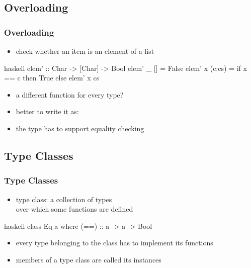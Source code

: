\documentclass[dvipsnames]{beamer}
\theoremstyle{plain}
\begin{document}
\subsection{Overloading}

\begin{frame}[fragile]
  \frametitle{Overloading}

  \begin{itemize}
    \item check whether an item is an element of a list
  \end{itemize}

  \begin{exampleblock}{}
    \begin{pygments}{haskell}
elem' :: Char -> [Char] -> Bool
elem' _ []     = False
elem' x (c:cs) = if x == c then True else elem' x cs
    \end{pygments}
  \end{exampleblock}

  \pause
  \begin{itemize}
    \item a different function for every type?
    \item better to write it as:\\
    \item the type has to support equality checking
  \end{itemize}
\end{frame}

\subsection{Type Classes}

\begin{frame}[fragile]
  \frametitle{Type Classes}

  \begin{itemize}
    \item \alert{type class}: a collection of types\\
      over which some functions are defined
  \end{itemize}

  \begin{exampleblock}{}
    \begin{pygments}{haskell}
class Eq a where
  (==) :: a -> a -> Bool
    \end{pygments}
  \end{exampleblock}

  \pause
  \begin{itemize}
    \item every type belonging to the class has to implement its functions
    \item members of a type class are called its \alert{instances}
  \end{itemize}
\end{frame}
\end{document}
